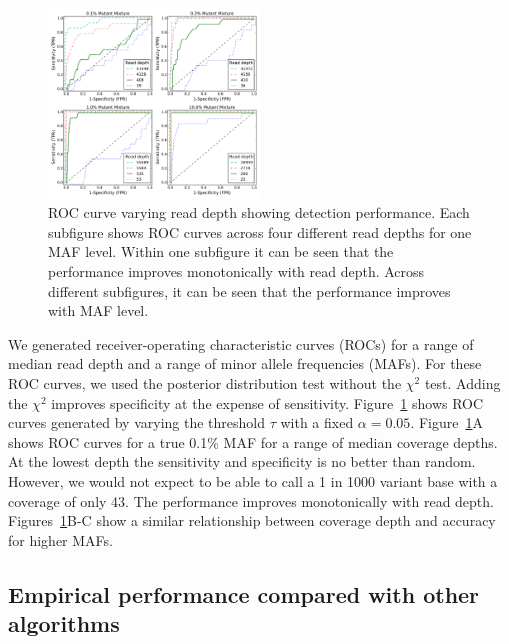 \documentclass{bioinfo}
\begin{document}
\begin{figure}[htbp]
\begin{center}
\includegraphics[width=0.5\textwidth]{pdf_figs/ROC_without_chi2.pdf}
\caption{ROC curve varying read depth showing detection performance. Each subfigure shows ROC curves across four different read depths for one MAF level. Within one subfigure it can be seen that the performance improves monotonically with read depth. Across different subfigures, it can be seen that the performance improves with MAF level.}
\label{fig:ROC}
\end{center}
\end{figure}

We generated receiver-operating characteristic curves (ROCs) for a range of median read depth and a range of minor allele frequencies (MAFs). For these ROC curves, we used the posterior distribution test without the $\chi^2$ test. Adding the $\chi^2$ improves specificity at the expense of sensitivity. Figure~\ref{fig:ROC} shows ROC curves generated by varying the threshold $\tau$ with a fixed $\alpha=0.05$. Figure~\ref{fig:ROC}A shows ROC curves for a true 0.1\% MAF for a range of median coverage depths. At the lowest depth the sensitivity and specificity is no better than random. However, we would not expect to be able to call a 1 in 1000 variant base with a coverage of only 43. The performance improves monotonically with read depth. Figures~\ref{fig:ROC}B-C show a similar relationship between coverage depth and accuracy for higher MAFs.



\subsection{Empirical performance compared with other algorithms}\label{sec:comparison}
\end{document}
